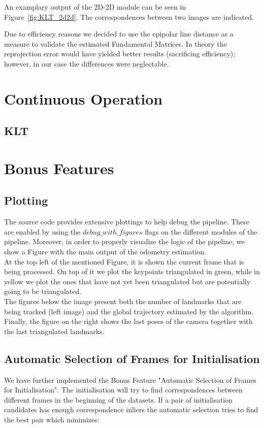 An examplary output of the 2D-2D module can be seen in Figure~\ref{fig:KLT_2d2d}. The correspondences between two images are indicated.

Due to efficiency reasons we decided to use the epipolar line distance as a measure to validate the estimated Fundamental Matrices. In theory the reprojection error would have yielded better results (sacrificing efficiency); however, in our case the differences were neglectable.

\section{Continuous Operation}
\label{s:ContOp}

\subsection{KLT}

\section{Bonus Features}
\label{s:BF}

\subsection{Plotting}
The source code provides extensive plottings to help debug the pipeline. These are enabled by using the $debug\_with\_figures$ flags
on the different modules of the pipeline. Moreover, in order to properly visualize the logic of the pipeline, we show a Figure 
with the main output of the odometry estimation. \\
At the top left of the mentioned Figure, it is shown the current frame that is being processed. On top of it we plot the keypoints
triangulated in green, while in yellow we plot the ones that have not yet been triangulated but are potentially going to be
triangulated. \\
The figures below the image present both the number of landmarks that are being tracked (left image) and the global trajectory
estimated by the algorithm. \\
Finally, the figure on the right shows the last poses of the camera together with the last triangulated landmarks.


\subsection{Automatic Selection of Frames for Initialisation}
We have further implemented the Bonus Feature "Automatic Selection of Frames for Initialisation". The initialisation will try to find correspondences between different frames in the beginning of the datasets. If a pair of initialisation candidates has enough correspondence inliers the automatic selection tries to find the best pair which minimizes:

